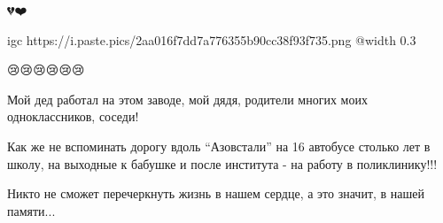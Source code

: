  
 
 
 
 

\qqSecCmt

💔❤️🙏


\ifcmt
  igc https://i.paste.pics/2aa016f7dd7a776355b90cc38f93f735.png
	@width 0.3
\fi

😢😢😢😢😢😢


Мой дед работал на этом заводе, мой дядя, родители многих моих одноклассников, соседи!

Как же не вспоминать дорогу вдоль \enquote{Азовстали} на 16 автобусе столько лет в
школу, на выходные к бабушке и после института - на работу в поликлинику!!!

Никто не сможет перечеркнуть жизнь в нашем сердце, а это значит, в нашей памяти...

